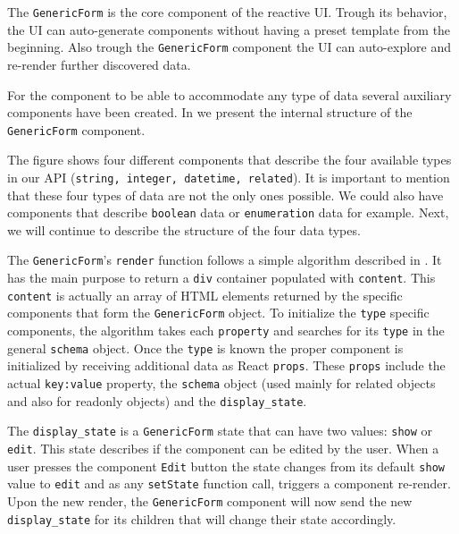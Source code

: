 The \texttt{GenericForm} is the core component of the reactive UI. Trough its behavior, the UI can auto-generate components without having a preset template from the beginning. Also trough the \texttt{GenericForm} component the UI can auto-explore and re-render further discovered data. 

For the component to be able to accommodate any type of data several auxiliary components have been created. In  we present the internal structure of the \texttt{GenericForm} component.  


The figure shows four different components that describe the four available types in our API (\texttt{string, integer, datetime, related}). It is important to mention that these four types of data are not the only ones possible. We could also have components that describe \texttt{boolean} data or \texttt{enumeration} data for example. Next, we will continue to describe the structure of the four data types.

The \texttt{GenericForm}'s \texttt{render} function follows a simple algorithm described in . It has the main purpose to return a \texttt{div} container populated with \texttt{content}. This \texttt{content} is actually an array of HTML elements returned by the specific components that form the \texttt{GenericForm} object. To initialize the \texttt{type} specific components, the algorithm takes each \texttt{property} and searches for its \texttt{type} in the general \texttt{schema} object. Once the \texttt{type} is known the proper component is initialized by receiving additional data as React \texttt{props}. These \texttt{props} include the actual \texttt{key:value} property, the \texttt{schema} object (used mainly for related objects and also for readonly objects) and the \texttt{display\_state}.

The \texttt{display\_state} is a \texttt{GenericForm} state that can have two values: \texttt{show} or \texttt{edit}. This state describes if the component can be edited by the user. When a user presses the component \texttt{Edit} button the state changes from its default \texttt{show} value to \texttt{edit} and as any \texttt{setState} function call, triggers a component re-render. Upon the new render, the \texttt{GenericForm} component will now send the new \texttt{display\_state} for its children that will change their state accordingly.

